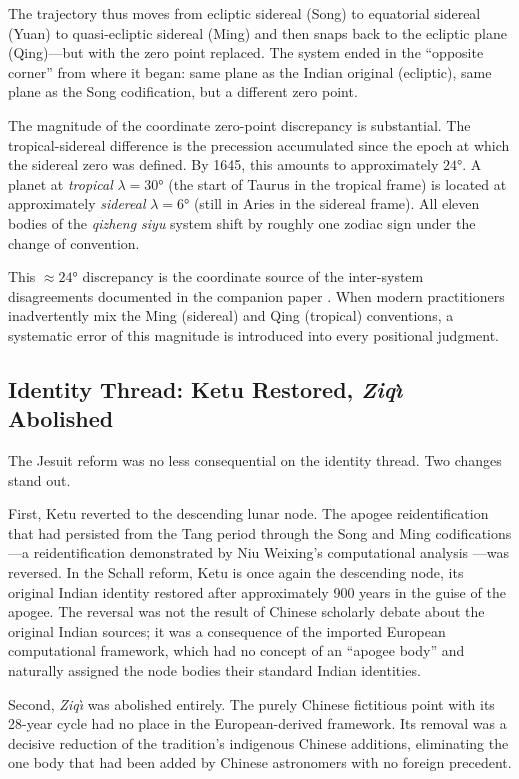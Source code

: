 \documentclass[10pt,a4paper]{article}
\providecommand{\degree}{\ensuremath{°}}
\begin{document}
The trajectory thus moves from ecliptic sidereal (Song) to equatorial
sidereal (Yuan) to quasi-ecliptic sidereal (Ming) and then snaps
back to the ecliptic plane (Qing)---but with the zero point
replaced.  The system ended in the ``opposite corner'' from where
it began: same plane as the Indian original (ecliptic), same plane
as the Song codification, but a different zero point.

The magnitude of the coordinate zero-point discrepancy is
substantial.  The tropical-sidereal difference is the precession
accumulated since the epoch at which the sidereal zero was defined.
By 1645, this amounts to approximately $24\degree$.  A planet at
\textit{tropical} $\lambda = 30\degree$ (the start of Taurus in
the tropical frame) is located at approximately \textit{sidereal}
$\lambda = 6\degree$ (still in Aries in the sidereal frame).  All
eleven bodies of the \textit{qizheng siyu} system shift by roughly one
zodiac sign under the change of convention.

This $\approx 24\degree$ discrepancy is the coordinate source of
the inter-system disagreements documented in the companion paper
\cite{liu2020missionary}.  When modern practitioners inadvertently
mix the Ming (sidereal) and Qing (tropical) conventions, a
systematic error of this magnitude is introduced into every
positional judgment.

\subsection*{Identity Thread: Ketu Restored, \textit{Ziq\`{\i}} Abolished}

The Jesuit reform was no less consequential on the identity thread.
Two changes stand out.

First, Ketu reverted to the descending lunar node.  The
apogee reidentification that had persisted from the Tang period
through the Song and Ming codifications---a reidentification
demonstrated by Niu Weixing's computational analysis
\cite{niu1995ketu}---was reversed.  In the Schall reform,
Ketu is once again the descending node, its original Indian
identity restored after approximately 900 years in the guise of
the apogee.  The reversal was not the result of Chinese scholarly
debate about the original Indian sources; it was a consequence of
the imported European computational framework, which had no concept
of an ``apogee body'' and naturally assigned the node bodies their
standard Indian identities.

Second, \textit{Ziq\`{\i}} was abolished entirely.  The purely Chinese
fictitious point with its 28-year cycle had no place in the
European-derived framework.  Its removal was a decisive reduction of
the tradition's indigenous Chinese additions, eliminating the one
body that had been added by Chinese astronomers with no foreign
precedent.
\end{document}
